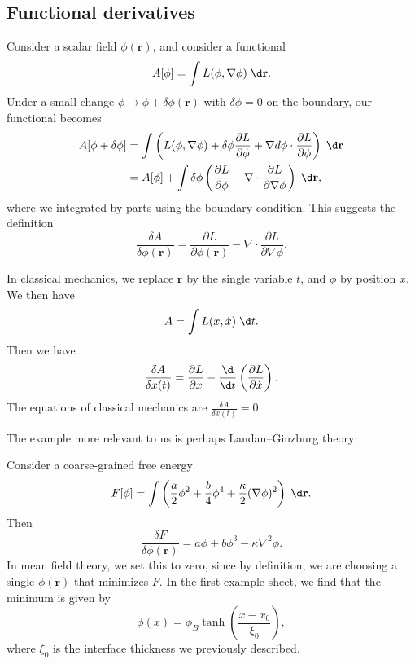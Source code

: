 \documentclass[a4paper]{article}
\begin{document}
\subsection{Functional derivatives}
Consider a scalar field $\phi(\mathbf{r})$, and consider a functional
\[
  A[\phi] = \int L(\phi, \nabla \phi)\;\d \mathbf{r}.
\]
Under a small change $\phi \mapsto \phi + \delta \phi(\mathbf{r})$ with $\delta \phi = 0$ on the boundary, our functional becomes
\begin{align*}
  A[\phi + \delta \phi] &= \int \left(L(\phi, \nabla \phi) + \delta \phi \frac{\partial L}{\partial \phi} + \nabla d \phi \cdot \frac{\partial L}{\partial \phi}\right)\;\d \mathbf{r}\\
  &= A[\phi] + \int \delta \phi \left(\frac{\partial L}{\partial \phi} - \nabla \cdot \frac{\partial L}{\partial \nabla \phi}\right)\;\d \mathbf{r},
\end{align*}
where we integrated by parts using the boundary condition. This suggests the definition
\[
  \frac{\delta A}{\delta \phi(\mathbf{r})} = \frac{\partial L}{\partial \phi(\mathbf{r})} - \nabla \cdot \frac{\partial L}{\partial \nabla \phi}.
\]
\begin{eg}
  In classical mechanics, we replace $\mathbf{r}$ by the single variable $t$, and $\phi$ by position $x$. We then have
  \[
    A = \int L(x, \dot{x})\;\d t.
  \]
  Then we have
  \[
    \frac{\delta A}{\delta x(t)} = \frac{\partial L}{\partial x} - \frac{\d}{\d t} \left(\frac{\partial L}{\partial \dot{x}}\right).
  \]
  The equations of classical mechanics are $\frac{\delta A}{\delta x(t)} = 0$.
\end{eg}

The example more relevant to us is perhaps Landau--Ginzburg theory:
\begin{eg}
  Consider a coarse-grained free energy
  \[
    F[\phi] = \int \left(\frac{a}{2} \phi^2 + \frac{b}{4} \phi^4 + \frac{\kappa}{2} (\nabla \phi)^2 \right)\;\d \mathbf{r}.
  \]
  Then
  \[
    \frac{\delta F}{\delta \phi(\mathbf{r})} = a \phi + b \phi^3 - \kappa \nabla^2 \phi.
  \]
  In mean field theory, we set this to zero, since by definition, we are choosing a single $\phi(\mathbf{r})$ that minimizes $F$. In the first example sheet, we find that the minimum is given by
  \[
    \phi(x) = \phi_B \tanh \left(\frac{x - x_0}{\xi_0}\right),
  \]
  where $\xi_0$ is the interface thickness we previously described.
\end{eg}
\end{document}

